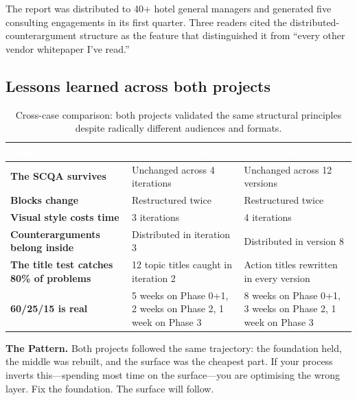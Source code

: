 The report was distributed to 40+ hotel general managers and generated five consulting engagements in its first quarter. Three readers cited the distributed-counterargument structure as the feature that distinguished it from ``every other vendor whitepaper I've read.''

\subsection{Lessons learned across both projects}

\begin{table}[H]
\centering
\small
{}
\begin{tabularx}{\textwidth}{>{\bfseries\color{heading}}l X X}
\toprule
\rowcolor{tableheader}
\textcolor{white}{\textbf{Lesson}} & \textcolor{white}{\textbf{Palantir evidence}} & \textcolor{white}{\textbf{GNR evidence}} \\
\midrule
The SCQA survives & Unchanged across 4 iterations & Unchanged across 12 versions \\
Blocks change & Restructured twice & Restructured twice \\
Visual style costs time & 3 iterations & 4 iterations \\
Counterarguments belong inside & Distributed in iteration 3 & Distributed in version 8 \\
The title test catches 80\% of problems & 12 topic titles caught in iteration 2 & Action titles rewritten in every version \\
60/25/15 is real & 5 weeks on Phase 0+1, 2 weeks on Phase 2, 1 week on Phase 3 & 8 weeks on Phase 0+1, 3 weeks on Phase 2, 1 week on Phase 3 \\
\bottomrule
\end{tabularx}
\caption{Cross-case comparison: both projects validated the same structural principles despite radically different audiences and formats.}
\label{tab:cross-case}
\end{table}

\begin{diagnosisbox}
\textbf{The Pattern.} Both projects followed the same trajectory: the foundation held, the middle was rebuilt, and the surface was the cheapest part. If your process inverts this---spending most time on the surface---you are optimising the wrong layer. Fix the foundation. The surface will follow.
\end{diagnosisbox}

